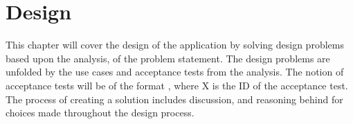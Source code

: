 \chapter{Design}
\label{chapter:design}
This chapter will cover the design of the application by solving design problems based upon the analysis, of the problem statement.
The design problems are unfolded by the use cases and acceptance tests from the analysis.
The notion of acceptance tests will be of the format , where X is the ID of the acceptance test.
The process of creating a solution includes discussion, and reasoning behind for choices made throughout the design process.











